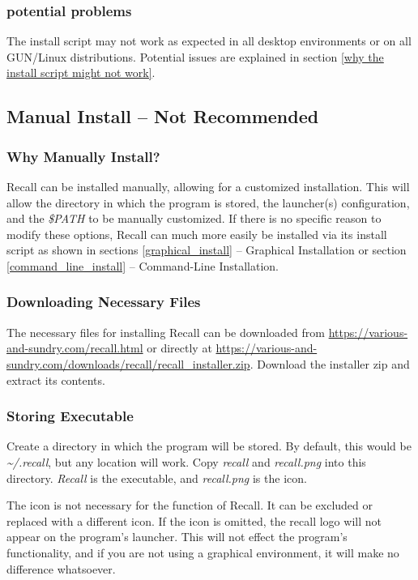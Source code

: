 \documentclass[letterpaper]{article}
\begin{document}
\subsubsection{potential problems}
The install script may not work as expected in all desktop environments or on all GUN/Linux distributions. Potential issues are explained in section \ref{why the install script might not work}.

\subsection{Manual Install -- Not Recommended}
\subsubsection{Why Manually Install?}
Recall can be installed manually, allowing for a customized installation. This will allow the directory in which the program is stored, the launcher(s) configuration, and the \textit{\$PATH} to be manually customized. If there is no specific reason to modify these options, Recall can much more easily be installed via its install script as shown in sections \ref{graphical_install} -- Graphical Installation or section \ref{command_line_install} -- Command-Line Installation.

\subsubsection{Downloading Necessary Files}
The necessary files for installing Recall can be downloaded from \href{https://various-and-sundry.com/recall.html}{https://various-and-sundry.com/recall.html} or directly at \href{https://various-and-sundry.com/downloads/recall/recall_installer.zip}{https://various-and-sundry.com/downloads/recall/recall\_installer.zip}. Download the installer zip and extract its contents.

\subsubsection{Storing Executable}
Create a directory in which the program will be stored. By default, this would be \textit{\~{}/.recall}, but any location will work. Copy \textit{recall} and \textit{recall.png} into this directory. \textit{Recall} is the executable, and \textit{recall.png} is the icon.

The icon is not necessary for the function of Recall. It can be excluded or replaced with a different icon. If the icon is omitted, the recall logo will not appear on the program's launcher. This will not effect the program's functionality, and if you are not using a graphical environment, it will make no difference whatsoever.
\end{document}
